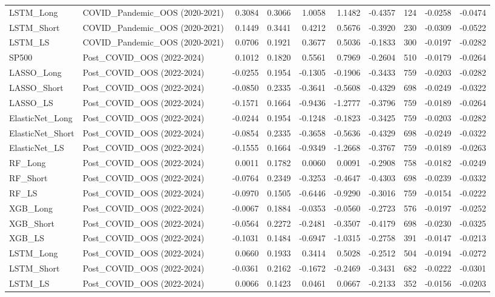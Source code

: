 \begin{tabular}{llrrrrrrrr}
\cline{1-10}
LSTM\_Long & COVID\_Pandemic\_OOS (2020-2021) & 0.3084 & 0.3066 & 1.0058 & 1.1482 & -0.4357 & 124 & -0.0258 & -0.0474 \\
\cline{1-10}
LSTM\_Short & COVID\_Pandemic\_OOS (2020-2021) & 0.1449 & 0.3441 & 0.4212 & 0.5676 & -0.3920 & 230 & -0.0309 & -0.0522 \\
\cline{1-10}
LSTM\_LS & COVID\_Pandemic\_OOS (2020-2021) & 0.0706 & 0.1921 & 0.3677 & 0.5036 & -0.1833 & 300 & -0.0197 & -0.0282 \\
\cline{1-10}
SP500 & Post\_COVID\_OOS (2022-2024) & 0.1012 & 0.1820 & 0.5561 & 0.7969 & -0.2604 & 510 & -0.0179 & -0.0264 \\
\cline{1-10}
LASSO\_Long & Post\_COVID\_OOS (2022-2024) & -0.0255 & 0.1954 & -0.1305 & -0.1906 & -0.3433 & 759 & -0.0203 & -0.0282 \\
\cline{1-10}
LASSO\_Short & Post\_COVID\_OOS (2022-2024) & -0.0850 & 0.2335 & -0.3641 & -0.5608 & -0.4329 & 698 & -0.0249 & -0.0322 \\
\cline{1-10}
LASSO\_LS & Post\_COVID\_OOS (2022-2024) & -0.1571 & 0.1664 & -0.9436 & -1.2777 & -0.3796 & 759 & -0.0189 & -0.0264 \\
\cline{1-10}
ElasticNet\_Long & Post\_COVID\_OOS (2022-2024) & -0.0244 & 0.1954 & -0.1248 & -0.1823 & -0.3425 & 759 & -0.0203 & -0.0282 \\
\cline{1-10}
ElasticNet\_Short & Post\_COVID\_OOS (2022-2024) & -0.0854 & 0.2335 & -0.3658 & -0.5636 & -0.4329 & 698 & -0.0249 & -0.0322 \\
\cline{1-10}
ElasticNet\_LS & Post\_COVID\_OOS (2022-2024) & -0.1555 & 0.1664 & -0.9349 & -1.2668 & -0.3767 & 759 & -0.0189 & -0.0263 \\
\cline{1-10}
RF\_Long & Post\_COVID\_OOS (2022-2024) & 0.0011 & 0.1782 & 0.0060 & 0.0091 & -0.2908 & 758 & -0.0182 & -0.0249 \\
\cline{1-10}
RF\_Short & Post\_COVID\_OOS (2022-2024) & -0.0764 & 0.2349 & -0.3253 & -0.4647 & -0.4303 & 698 & -0.0239 & -0.0332 \\
\cline{1-10}
RF\_LS & Post\_COVID\_OOS (2022-2024) & -0.0970 & 0.1505 & -0.6446 & -0.9290 & -0.3016 & 759 & -0.0154 & -0.0222 \\
\cline{1-10}
XGB\_Long & Post\_COVID\_OOS (2022-2024) & -0.0067 & 0.1884 & -0.0353 & -0.0560 & -0.2723 & 576 & -0.0197 & -0.0252 \\
\cline{1-10}
XGB\_Short & Post\_COVID\_OOS (2022-2024) & -0.0564 & 0.2272 & -0.2481 & -0.3507 & -0.4179 & 698 & -0.0230 & -0.0325 \\
\cline{1-10}
XGB\_LS & Post\_COVID\_OOS (2022-2024) & -0.1031 & 0.1484 & -0.6947 & -1.0315 & -0.2758 & 391 & -0.0147 & -0.0213 \\
\cline{1-10}
LSTM\_Long & Post\_COVID\_OOS (2022-2024) & 0.0660 & 0.1933 & 0.3414 & 0.5028 & -0.2512 & 504 & -0.0194 & -0.0272 \\
\cline{1-10}
LSTM\_Short & Post\_COVID\_OOS (2022-2024) & -0.0361 & 0.2162 & -0.1672 & -0.2469 & -0.3431 & 682 & -0.0222 & -0.0301 \\
\cline{1-10}
LSTM\_LS & Post\_COVID\_OOS (2022-2024) & 0.0066 & 0.1423 & 0.0461 & 0.0667 & -0.2133 & 352 & -0.0156 & -0.0203 \\
\cline{1-10}
\bottomrule
\end{tabular}
